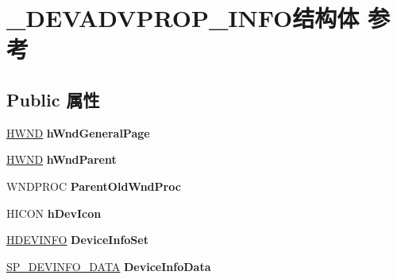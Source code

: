 \hypertarget{struct___d_e_v_a_d_v_p_r_o_p___i_n_f_o}{}\section{\+\_\+\+D\+E\+V\+A\+D\+V\+P\+R\+O\+P\+\_\+\+I\+N\+F\+O结构体 参考}
\label{struct___d_e_v_a_d_v_p_r_o_p___i_n_f_o}
\subsection*{Public 属性}
\begin{DoxyCompactItemize}
\item 
\mbox{\label{struct___d_e_v_a_d_v_p_r_o_p___i_n_f_o_ad042e422f829114b4923d060a2856125}} 
\hyperlink{interfacevoid}{H\+W\+ND} {\bfseries h\+Wnd\+General\+Page}
\item 
\mbox{\label{struct___d_e_v_a_d_v_p_r_o_p___i_n_f_o_a800f2ab63ef2549ce149aa75a207aecc}} 
\hyperlink{interfacevoid}{H\+W\+ND} {\bfseries h\+Wnd\+Parent}
\item 
\mbox{\label{struct___d_e_v_a_d_v_p_r_o_p___i_n_f_o_a498a7cb85d3660d7704855a497c32773}} 
W\+N\+D\+P\+R\+OC {\bfseries Parent\+Old\+Wnd\+Proc}
\item 
\mbox{\label{struct___d_e_v_a_d_v_p_r_o_p___i_n_f_o_abbc7e2d3055d8836c8e6809b665634cf}} 
H\+I\+C\+ON {\bfseries h\+Dev\+Icon}
\item 
\mbox{\label{struct___d_e_v_a_d_v_p_r_o_p___i_n_f_o_a36085a53223f5ef3c248d374cd47fd5f}} 
\hyperlink{interfacevoid}{H\+D\+E\+V\+I\+N\+FO} {\bfseries Device\+Info\+Set}
\item 
\mbox{\label{struct___d_e_v_a_d_v_p_r_o_p___i_n_f_o_a952c40333436a9bea7f4f25785452185}} 
\hyperlink{struct___s_p___d_e_v_i_n_f_o___d_a_t_a}{S\+P\+\_\+\+D\+E\+V\+I\+N\+F\+O\+\_\+\+D\+A\+TA} {\bfseries Device\+Info\+Data}
\item 
\mbox{\label{struct___d_e_v_a_d_v_p_r_o_p___i_n_f_o_aa9b0246fcc116608da7e0edcfd0694cc}} 

\end{DoxyCompactItemize}
